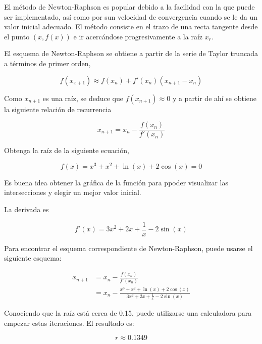 El método de Newton-Raphson es popular debido a la facilidad con la que puede
ser implementado, así como por sun velocidad de convergencia cuando se le da un
valor inicial adecuado. El método consiste en el trazo de una recta tangente
desde el punto $(x, f(x))$ e ir acercándose progresivamente a la raíz $x_r$.

El esquema de Newton-Raphson se obtiene a partir de la serie de Taylor truncada
a términos de primer orden,

\[
	f(x_{x+1}) \approx f(x_n) + f'(x_n)(x_{n+1} - x_n)
\]

Como $x_{n+1}$ es una raíz, se deduce que $f(x_{n+1}) \approx 0$ y a partir de
ahí se obtiene la siguiente relación de recurrencia

\begin{equation}\label{eqn:newton}
	x_{n+1} = x_n - \frac{f(x_n)}{f'(x_n)}
\end{equation}

\begin{ex}
	Obtenga la raíz de la siguiente ecuación,

	\[
		f(x) = x^3 + x^2 + \ln(x) + 2 \cos(x) = 0
	\]

	\begin{solution}

		Es buena idea obtener la gráfica de la función para ppoder
		visualizar las intersecciones y elegir un mejor valor inicial.

		La derivada es 

		\[
			f'(x) = 3x^2 + 2x + \frac{1}{x} - 2 \sin(x)
		\]

		Para encontrar el esquema correspondiente de Newton-Raphson,
		puede usarse el siguiente esquema:

		\begin{align*}
			x_{n+1} &= x_n - \frac{f(x_n)}{f'(x_n)} \\
				&= x_n - \frac{x^3 + x^2 + \ln(x) + 2
				\cos(x)}{3x^2 + 2x + \frac{1}{x} - 2 \sin(x)}
		\end{align*}

		Conociendo que la raíz está cerca de 0.15, puede utilizarse una
		calculadora para empezar estas iteraciones. El resultado es:

		\[
			\boxed{r \approx 0.1349}
		\]

	\end{solution}

\end{ex}

